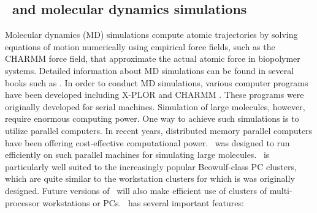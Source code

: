 \subsection{\NAMD\ and molecular dynamics simulations}

Molecular dynamics (MD) simulations compute atomic trajectories by solving
equations of motion numerically using empirical force fields, such as the 
CHARMM force field, that approximate the actual atomic force in 
biopolymer systems. Detailed information about MD simulations can be found in
several books such as 
. 
In order to conduct MD simulations, various computer programs have been 
developed including
X-PLOR  and 
CHARMM .
These programs were originally developed for serial machines. 
Simulation of large molecules, however, require enormous computing power. 
One way to achieve such simulations is to utilize parallel computers. In recent 
years, distributed memory parallel computers have been offering
cost-effective computational power.  \NAMD\ was designed to run efficiently
on such parallel 
machines for simulating large molecules. 
\NAMD\ is particularly well suited to the increasingly popular Beowulf-class PC clusters, which are quite similar to the workstation clusters for which is was originally designed.
Future versions of \NAMD\ will also make efficient use of clusters of multi-processor workstations or PCs.
\prettypar
\NAMD\ has several important features: 

